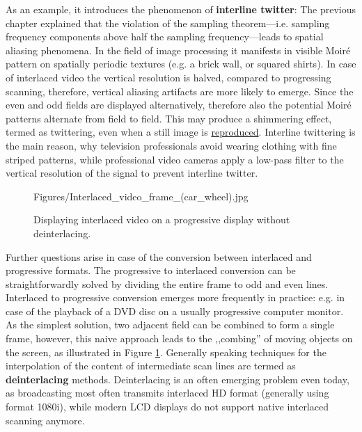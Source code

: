As an example, it introduces the phenomenon of \textbf{interline twitter}:
The previous chapter explained that the violation of the sampling theorem---i.e. sampling frequency components above half the sampling frequency---leads to spatial aliasing phenomena.
In the field of image processing it manifests in visible Moiré pattern on spatially periodic textures (e.g. a brick wall, or squared shirts).
In case of interlaced video the vertical resolution is halved, compared to progressing scanning, therefore, vertical aliasing artifacts are more likely to emerge.
Since the even and odd fields are displayed alternatively, therefore also the potential Moiré patterns alternate from field to field.
This may produce a shimmering effect, termed as twittering, even when a still image is \href{https://en.wikipedia.org/wiki/File:Indian_Head_interlace.gif}{reproduced}.
Interline twittering is the main reason, why television professionals avoid wearing clothing with fine striped patterns, while professional video cameras apply a low-pass filter to the vertical resolution of the signal to prevent interline twitter. 

\begin{figure}  
\small
  \begin{minipage}[c]{0.64\textwidth}
	\begin{overpic}[width = 1\columnwidth ]{Figures/Interlaced_video_frame_(car_wheel).jpg}
	\end{overpic}   \end{minipage}\hfill
	\begin{minipage}[c]{0.3\textwidth}
    \caption{
    Displaying interlaced video on a progressive display without deinterlacing.}
\label{fig:deinterlacing}  \end{minipage}
\end{figure}

Further questions arise in case of the conversion between interlaced and progressive formats.
The progressive to interlaced conversion can be straightforwardly solved by dividing the entire frame to odd and even lines.
Interlaced to progressive conversion emerges more frequently in practice: e.g. in case of the playback of a DVD disc on a usually progressive computer monitor.
As the simplest solution, two adjacent field can be combined to form a single frame, however, this naive approach leads to the ,,combing'' of moving objects on the screen, as illustrated in Figure \ref{fig:deinterlacing}.
Generally speaking techniques for the interpolation of the content of intermediate scan lines are termed as \textbf{deinterlacing} methods.
Deinterlacing is an often emerging problem even today, as broadcasting most often transmits interlaced HD format (generally using format 1080i), while modern LCD displays do not support native interlaced scanning anymore.


